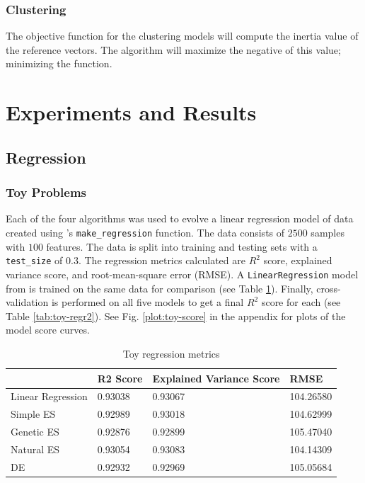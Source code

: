 \documentclass[conference]{IEEEtran}
\begin{document}
\subsubsection{Clustering}
The objective function for the clustering models will compute the inertia value of the reference vectors. The algorithm will maximize the negative of 
this value; minimizing the function.

\section{Experiments and Results}
\subsection{Regression}
\subsubsection{Toy Problems}
Each of the four algorithms was used to evolve a linear regression model of data created using \cite{scikit}'s \texttt{make\_regression} function. 
The data consists of $2500$ samples with $100$ features. The data is split into training and testing sets with a \texttt{test\_size} of $0.3$. The 
regression metrics calculated are $R^2$ score, explained variance score, and root-mean-square error (RMSE). A \texttt{LinearRegression} model from 
\cite{scikit} is trained on the same data for comparison (see Table \ref{tab:toy-regr1}). Finally, cross-validation is performed on all five models to 
get a final $R^2$ score for each (see Table \ref{tab:toy-regr2}). See Fig. \ref{plot:toy-score} in the appendix for plots of the model score curves.

\begin{table}[htbp]
\centering
\begin{tabular}{@{}llll@{}}
\toprule
 & R2 Score & Explained Variance Score & RMSE \\ \midrule
Linear Regression & 0.93038 & 0.93067 & 104.26580 \\
Simple ES & 0.92989 & 0.93018 & 104.62999 \\
Genetic ES & 0.92876 & 0.92899 & 105.47040 \\
Natural ES & \cellcolor[HTML]{C0C0C0}0.93054 & \cellcolor[HTML]{C0C0C0}0.93083 & \cellcolor[HTML]{C0C0C0}104.14309 \\
DE & 0.92932 & 0.92969 & 105.05684 \\ \bottomrule
\end{tabular}
\caption{Toy regression metrics}
\label{tab:toy-regr1}
\end{table}
\end{document}
